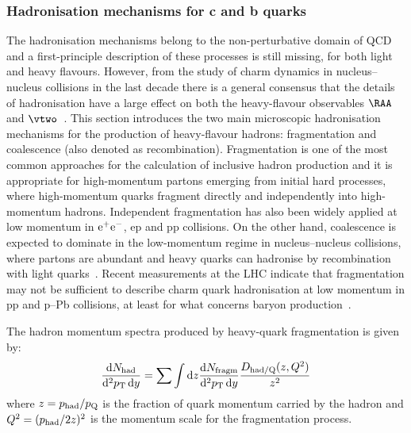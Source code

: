\subsubsection{Hadronisation mechanisms for c and b quarks}
\label{sec:HFhadro1}


The hadronisation mechanisms belong to the non-perturbative domain of QCD and a
first-principle description of these processes is still missing, for both light and heavy flavours.
However, from the study of charm dynamics in nucleus--nucleus collisions in the last decade
there is a general consensus that the details of hadronisation have a large effect on both the heavy-flavour observables 
$\RAA$ and $\vtwo$~\cite{Dong:2018ntm,Rapp:2018qla,Scardina:2017ipo}.
This section introduces 
the two main microscopic hadronisation mechanisms for the production of heavy-flavour hadrons: fragmentation and coalescence (also denoted as recombination).
Fragmentation is one of the most common approaches for the calculation of inclusive hadron production and it is appropriate
for high-momentum partons emerging
from initial hard processes, where high-momentum quarks fragment directly and independently into high-momentum hadrons. Independent fragmentation has also been widely applied at low momentum in $\rm e^+e^-$, ep and pp collisions.
On the other hand, coalescence is expected to dominate in the low-momentum regime in nucleus--nucleus collisions, where partons are abundant and heavy quarks
can hadronise by recombination with light quarks~\cite{Fries:2008hs}. Recent measurements at the LHC indicate that fragmentation may not be sufficient to 
describe charm quark hadronisation at low momentum in pp and p--Pb collisions, at least
for what concerns baryon production~\cite{Acharya:2017kfy,Acharya:2017lwf}.

The hadron momentum spectra produced by heavy-quark fragmentation is given by:
\begin{equation}
\frac{{\rm d}N_{\rm had}}{{\rm d}^{2}p\sb{\scriptstyle\mathrm{T}}\,{\rm d} y}=\sum \int {\rm d} z \frac{{\rm d} N_{\rm fragm}}{{\rm d}^{2}p\sb{\scriptstyle\mathrm{T}}\, {\rm d} y} \frac{D_{\rm had/Q}(z,Q^{2})}{z^{2}} 
\label{Eq:frag}
\end{equation}
where $z=p_{\rm had}/p_{\rm Q}$ is the fraction of quark momentum carried by the hadron and $Q^2=(p_{\rm had}/2 z)^2$ 
is the momentum scale for the fragmentation process.

